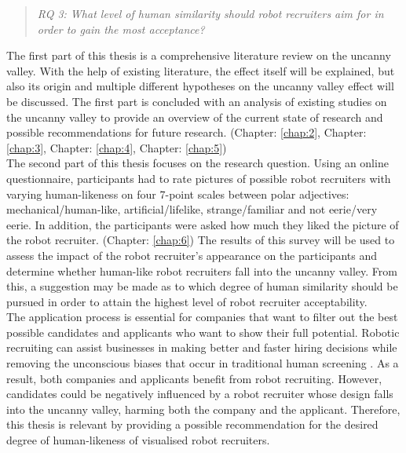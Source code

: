 \begin{quote}\emph{RQ 3: What level of human similarity should robot recruiters aim for in order to gain the most acceptance?}\end{quote} 


The first part of this thesis is a comprehensive literature review on the uncanny valley. With the help of existing literature, the effect itself will be explained, but also its origin and multiple different hypotheses on the uncanny valley effect will be discussed. The first part is concluded with an analysis of existing studies on the uncanny valley to provide an overview of the current state of research and possible recommendations for future research. (Chapter: \ref{chap:2},  Chapter: \ref{chap:3},  Chapter: \ref{chap:4},  Chapter: \ref{chap:5})\\
The second part of this thesis focuses on the research question. Using an online questionnaire, participants had to rate pictures of possible robot recruiters with varying human-likeness on four 7-point scales between polar adjectives: mechanical/human-like, artificial/lifelike, strange/familiar and not eerie/very eerie. In addition, the participants were asked how much they liked the picture of the robot recruiter. (Chapter: \ref{chap:6})\newline
The results of this survey will be used to assess the impact of the robot recruiter's appearance on the participants and determine whether human-like robot recruiters fall into the uncanny valley. From this, a suggestion may be made as to which degree of human similarity should be pursued in order to attain the highest level of robot recruiter acceptability.\\
The application process is essential for companies that want to filter out the best possible candidates and applicants who want to show their full potential. Robotic recruiting can assist businesses in making better and faster hiring decisions while removing the unconscious biases that occur in traditional human screening \cite{robot_recruiting_scholar}. As a result, both companies and applicants benefit from robot recruiting. However, candidates could be negatively influenced by a robot recruiter whose design falls into the uncanny valley, harming both the company and the applicant. Therefore, this thesis is relevant by providing a possible recommendation for the desired degree of human-likeness of visualised robot recruiters.